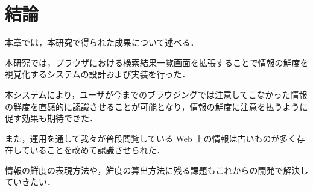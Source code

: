 \chapter{結論}
\label{chap:conclusion}

本章では，本研究で得られた成果について述べる．

\newpage

本研究では，ブラウザにおける検索結果一覧画面を拡張することで情報の鮮度を視覚化するシステムの設計および実装を行った．

本システムにより，ユーザが今までのブラウジングでは注意してこなかった情報の鮮度を直感的に認識させることが可能となり，情報の鮮度に注意を払うように促す効果も期待できた．

また，運用を通して我々が普段閲覧している Web 上の情報は古いものが多く存在していることを改めて認識させられた．

情報の鮮度の表現方法や，鮮度の算出方法に残る課題もこれからの開発で解決していきたい．
